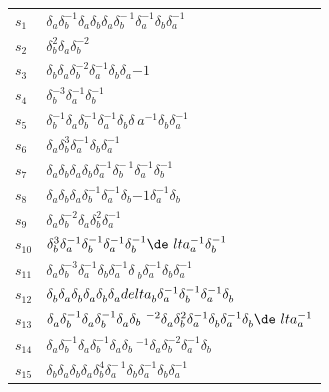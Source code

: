 \documentclass{article}
\begin{document}
\begin{center}
\begin{tabular}{ll}
\midrule
$s_{1}$ & $\delta_a^{}\delta_b^{-1}\delta_a^{}\delta_b^{}\delta_a^{}\delta_b^{-\
1}\delta_a^{-1}\delta_b^{}\delta_a^{-1}$ \\
$s_{2}$ & $\delta_b^{2}\delta_a^{}\delta_b^{-2}$ \\
$s_{3}$ & $\delta_b^{}\delta_a^{}\delta_b^{-2}\delta_a^{-1}\delta_b^{}\delta_a^\
{-1}$ \\
$s_{4}$ & $\delta_b^{-3}\delta_a^{-1}\delta_b^{-1}$ \\
$s_{5}$ & $\delta_b^{-1}\delta_a^{}\delta_b^{-1}\delta_a^{-1}\delta_b^{}\delta_\
a^{-1}\delta_b^{}\delta_a^{-1}$ \\
$s_{6}$ & $\delta_a^{}\delta_b^{3}\delta_a^{-1}\delta_b^{}\delta_a^{-1}$ \\
$s_{7}$ & $\delta_a^{}\delta_b^{}\delta_a^{}\delta_b^{}\delta_a^{-1}\delta_b^{-\
1}\delta_a^{-1}\delta_b^{-1}$ \\
$s_{8}$ & $\delta_a^{}\delta_b^{}\delta_a^{}\delta_b^{-1}\delta_a^{-1}\delta_b^\
{-1}\delta_a^{-1}\delta_b^{}$ \\
$s_{9}$ & $\delta_a^{}\delta_b^{-2}\delta_a^{}\delta_b^{2}\delta_a^{-1}$ \\
$s_{10}$ & $\delta_b^{3}\delta_a^{-1}\delta_b^{-1}\delta_a^{-1}\delta_b^{-1}\de\
lta_a^{-1}\delta_b^{-1}$ \\
$s_{11}$ & $\delta_a^{}\delta_b^{-3}\delta_a^{-1}\delta_b^{}\delta_a^{-1}\delta\
_b^{}\delta_a^{-1}\delta_b^{}\delta_a^{-1}$ \\
$s_{12}$ & $\delta_b^{}\delta_a^{}\delta_b^{}\delta_a^{}\delta_b^{}\delta_a^{}\\
delta_b^{}\delta_a^{-1}\delta_b^{-1}\delta_a^{-1}\delta_b^{}$ \\
$s_{13}$ & $\delta_a^{}\delta_b^{-1}\delta_a^{}\delta_b^{-1}\delta_a^{}\delta_b\
^{-2}\delta_a^{}\delta_b^{2}\delta_a^{-1}\delta_b^{}\delta_a^{-1}\delta_b^{}\de\
lta_a^{-1}$ \\
$s_{14}$ & $\delta_a^{}\delta_b^{-1}\delta_a^{}\delta_b^{-1}\delta_a^{}\delta_b\
^{-1}\delta_a^{}\delta_b^{-2}\delta_a^{-1}\delta_b^{}$ \\
$s_{15}$ & $\delta_b^{}\delta_a^{}\delta_b^{}\delta_a^{}\delta_b^{4}\delta_a^{-\
1}\delta_b^{}\delta_a^{-1}\delta_b^{}\delta_a^{-1}$ \\
\bottomrule
\end{tabular}
\end{center}

\thispagestyle{empty}
\end{document}

